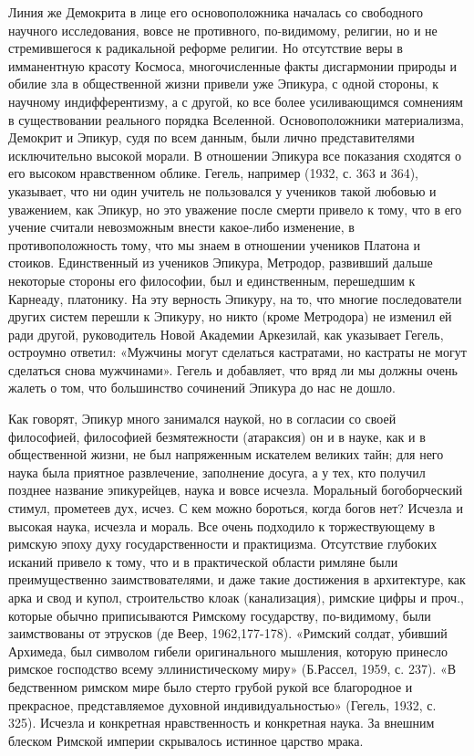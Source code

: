 Линия же Демокрита в лице его основоположника началась со свободного
научного исследования, вовсе не противного, по-видимому, религии, но и
не стремившегося к радикальной реформе религии. Но отсутствие веры в
имманентную красоту Космоса, многочисленные факты дисгармонии природы
и обилие зла в общественной жизни привели уже Эпикура, с одной
стороны, к научному индифферентизму, а с другой, ко все более
усиливающимся сомнениям в существовании реального порядка Вселенной.
Основоположники материализма, Демокрит и Эпикур, судя по всем данным,
были лично представителями исключительно высокой морали. В отношении
Эпикура все показания сходятся о его высоком нравственном облике.
Гегель, например (1932, с. 363 и 364), указывает, что ни один учитель
не пользовался у учеников такой любовью и уважением, как Эпикур, но
это уважение после смерти привело к тому, что в его учение считали
невозможным внести какое-либо изменение, в противоположность тому, что
мы знаем в отношении учеников Платона и стоиков. Единственный из
учеников Эпикура, Метродор, развивший дальше некоторые стороны его
философии, был и единственным, перешедшим к Карнеаду, платонику. На
эту верность Эпикуру, на то, что многие последователи других систем
перешли к Эпикуру, но никто (кроме Метродора) не изменил ей ради
другой, руководитель Новой Академии Аркезилай, как указывает Гегель,
остроумно ответил: «Мужчины могут сделаться кастратами, но кастраты не
могут сделаться снова мужчинами». Гегель и добавляет, что вряд ли мы
должны очень жалеть о том, что большинство сочинений Эпикура до нас не
дошло.

Как говорят, Эпикур много занимался наукой, но в согласии со своей
философией, философией безмятежности (атараксия) он и в науке, как и в
общественной жизни, не был напряженным искателем великих тайн; для
него наука была приятное развлечение, заполнение досуга, а у тех, кто
получил позднее название эпикурейцев, наука и вовсе исчезла. Моральный
богоборческий стимул, прометеев дух, исчез. С кем можно бороться,
когда богов нет? Исчезла и высокая наука, исчезла и мораль. Все очень
подходило к торжествующему в римскую эпоху духу государственности и
практицизма. Отсутствие глубоких исканий привело к тому, что и в
практической области римляне были преимущественно заимствователями, и
даже такие достижения в архитектуре, как арка и свод и купол,
строительство клоак (канализация), римские цифры и проч., которые
обычно приписываются Римскому государству, по-видимому, были
заимствованы от этрусков (де Веер, 1962,177-178). «Римский солдат,
убивший Архимеда, был символом гибели оригинального мышления, которую
принесло римское господство всему эллинистическому миру» (Б.Рассел,
1959, с. 237). «В бедственном римском мире было стерто грубой рукой
все благородное и прекрасное, представляемое духовной
индивидуальностью» (Гегель, 1932, с. 325). Исчезла и конкретная
нравственность и конкретная наука. За внешним блеском Римской империи
скрывалось истинное царство мрака.


